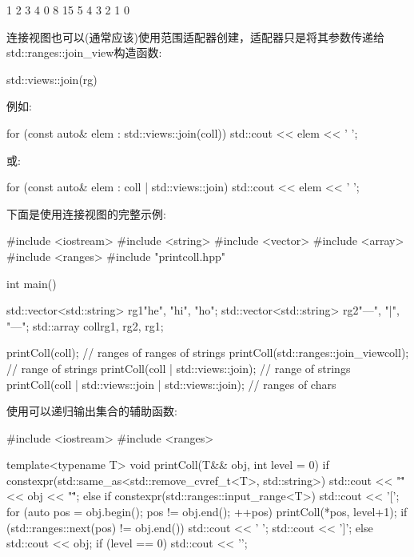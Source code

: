 \begin{shell}
1 2 3 4 0 8 15 5 4 3 2 1 0
\end{shell}


连接视图也可以(通常应该)使用范围适配器创建，适配器只是将其参数传递给std::ranges::join\_view构造函数:

\begin{cpp}
std::views::join(rg)
\end{cpp}

例如:

\begin{cpp}
for (const auto& elem : std::views::join(coll)) {
	std::cout << elem << ' ';
}
\end{cpp}

或:

\begin{cpp}
for (const auto& elem : coll | std::views::join) {
	std::cout << elem << ' ';
}
\end{cpp}

下面是使用连接视图的完整示例:


\begin{cpp}
#include <iostream>
#include <string>
#include <vector>
#include <array>
#include <ranges>
#include "printcoll.hpp"

int main()
{
	std::vector<std::string> rg1{"he", "hi", "ho"};
	std::vector<std::string> rg2{"---", "|", "---"};
	std::array coll{rg1, rg2, rg1};
	
	printColl(coll); // ranges of ranges of strings
	printColl(std::ranges::join_view{coll}); // range of strings
	printColl(coll | std::views::join); // range of strings
	printColl(coll | std::views::join | std::views::join); // ranges of chars
}
\end{cpp}

使用可以递归输出集合的辅助函数:


\begin{cpp}
#include <iostream>
#include <ranges>

template<typename T>
void printColl(T&& obj, int level = 0)
{
	if constexpr(std::same_as<std::remove_cvref_t<T>, std::string>) {
		std::cout << "\"" << obj << "\"";
	}
	else if constexpr(std::ranges::input_range<T>) {
		std::cout << '[';
		for (auto pos = obj.begin(); pos != obj.end(); ++pos) {
			printColl(*pos, level+1);
			if (std::ranges::next(pos) != obj.end()) {
				std::cout << ' ';
			}
		}
		std::cout << ']';
	}
	else {
		std::cout << obj;
	}
	if (level == 0) std::cout << '\n';
}
\end{cpp}

